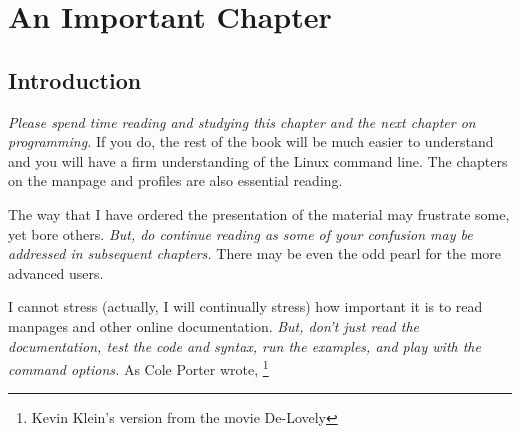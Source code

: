 \chapter{An Important Chapter}
\label{ch:impch}
\pagestyle{fancy}
\fancyhf{} %
\fancyhead[OC]{\leftmark} %
\setlength{\headheight}{13.99pt} 
\cfoot{\thepage} %
		

\section{Introduction}

\textit{Please spend time reading and studying this chapter and the next chapter on programming.} If you do, the rest of the book will be much easier to understand and you will have a firm understanding of the Linux command line. The chapters on the manpage and profiles are also essential reading.

The way that I have ordered the presentation of the material may frustrate some, yet bore others. \textit{But, do continue reading as some of your confusion may be addressed in subsequent chapters.} There may be even the odd pearl for the more advanced users.

I cannot stress (actually, I will continually stress) how important it is to read manpages and other online documentation. \textit{But, don't just read the documentation, test the code and syntax, run the examples, and play with the command options.} As Cole Porter wrote, \footnote{Kevin Klein's version from the movie De-Lovely}


